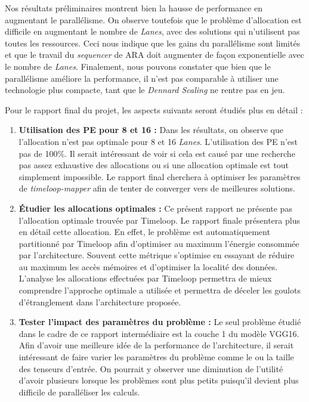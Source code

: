 \documentclass[11pt,letterpaper]{article}
\begin{document}
    \begin{multicols}{2}
        Nos résultats préliminaires montrent bien la hausse de performance en augmentant le parallélisme. On 
        observe toutefois que le problème d'allocation est difficile en augmentant le nombre de \textit{Lanes}, 
        avec des solutions qui n'utilisent pas toutes les ressources. Ceci nous indique que les gains du parallélisme 
        sont limités et que le travail du \textit{sequencer} de ARA doit augmenter de façon exponentielle avec le 
        nombre de \textit{Lanes}. Finalement, nous pouvons constater que bien que le parallélisme améliore la performance,
        il n'est pas comparable à utiliser une technologie plus compacte, tant que le \textit{Dennard Scaling} ne 
        rentre pas en jeu.

    \noindent Pour le rapport final du projet, les aspects suivants seront étudiés plus en détail :
    \begin{enumerate}
        \item \textbf{Utilisation des PE pour 8 et 16  :}
            Dans les résultats, on observe que l'allocation n'est pas optimale pour 8 et 16 \textit{Lanes}.
            L'utilisation des PE n'est pas de 100\%. Il serait intéressant de voir si cela est causé par une 
            recherche pas assez exhaustive des allocations ou si une allocation optimale est tout simplement 
            impossible. Le rapport final cherchera à optimiser les paramètres de \textit{timeloop-mapper} afin
            de tenter de converger vers de meilleures solutions.
        \item \textbf{Étudier les allocations optimales :}
            Ce présent rapport ne présente pas l'allocation optimale trouvée par Timeloop. Le rapport finale 
            présentera plus en détail cette allocation. En effet, le problème est automatiquement partitionné
            par Timeloop afin d'optimiser au maximum l'énergie consommée par l'architecture. Souvent cette métrique
            s'optimise en essayant de réduire au maximum les accès mémoires et d'optimiser la localité des données.
            L'analyse les allocations effectuées par Timeloop permettra de mieux comprendre l'approche optimale a utilisée
            et permettra de déceler les goulots d'étranglement dans l'architecture proposée.
        \item \textbf{Tester l'impact des paramètres du problème :} 
            Le seul problème étudié dans le cadre de ce rapport intermédiaire est la couche 1 du modèle VGG16.
            Afin d'avoir une meilleure idée de la performance de l'architecture, il serait intéressant de faire
            varier les paramètres du problème comme le  ou la taille des tenseurs d'entrée. On pourrait
            y observer une diminution de l'utilité d'avoir plusieurs  lorsque les problèmes sont plus petits
            puisqu'il devient plus difficile de paralléliser les calculs.
    \end{enumerate}
    \end{multicols}
\end{document}
